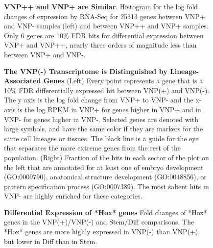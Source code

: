 \documentclass[aps,prl,twocolumn,superscriptaddress]{revtex4}
\begin{document}
\begin{figure}[H]
\begin{center}

\caption{\label{FIG:PLUSS} \textbf{VNP++ and VNP+ are Similar}. 
Histogram for the log fold changes of expression by RNA-Seq for 25313 genes between VNP+ and VNP- samples (left) and between VNP++ and VNP+ samples. Only 6 genes are 10\% FDR hits for differential expression between VNP+ and VNP++, nearly three orders of magnitude less than between VNP+ and VNP-.
}
\end{center}
\end{figure}


\begin{figure}[H]
\begin{center}

\caption{\label{FIG:tophits} 
\textbf{The VNP(-) Transcriptome is Distinguished by Lineage-Associated Genes}
(Left) Every point represents a gene that is a 10\% FDR differentially expressed hit between VNP(+) and VNP(-). The y axis is the log fold change from VNP+ to VNP- and the x-axis is the log RPKM in VNP+ for genes higher in VNP+ and in VNP- for genes higher in VNP-. Selected genes are denoted with large symbols, and have the same color if they are markers for the same cell lineages or tissues. The black line is a guide for the eye that separates the more extreme genes from the rest of the population. 
(Right) Fraction of the hits in each sector of the plot on the left that are annotated for at least one of embryo development (GO:0009790), anatomical structure development (GO:0048856), or pattern specification process (GO:0007389). The most salient hits in VNP- are highly enriched for these categories.
}
\end{center}
\end{figure}


\begin{figure}[H]
\begin{center}

\caption{\label{FIG:hox} \textbf{Differential Expression of *Hox* genes}
Fold changes of *Hox* genes in the VNP(+)/VNP(-) and Stem/Diff comparisons. The *Hox* genes are more highly expressed in VNP(-) than VNP(+), but lower in Diff than in Stem. 
}
\end{center}
\end{figure}
\end{document}
